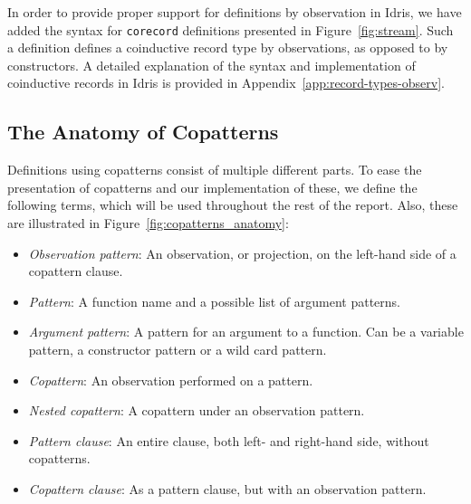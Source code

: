 

In order to provide proper support for definitions by observation in Idris, we
have added the syntax for \texttt{corecord} definitions presented in
Figure~\ref{fig:stream}. Such a definition defines a coinductive record type by observations, as opposed to
by constructors. A detailed explanation of the syntax and implementation of
coinductive records in Idris is provided in Appendix~\ref{app:record-types-observ}.





\subsection{The Anatomy of Copatterns}
Definitions using copatterns consist of multiple different parts. To ease the
presentation of copatterns and our implementation of these, we define the
following terms, which will be used throughout the rest of the report. Also,
these are illustrated in
Figure~\ref{fig:copatterns_anatomy}:

\newcommand{\itemEmph}[1]{\item \emph{#1}:}

\begin{itemize}
\itemEmph{Observation pattern} An observation, or projection, on the
  left-hand side of a copattern clause.
\itemEmph{Pattern} A function name and a possible list of argument patterns.
\itemEmph{Argument pattern} A pattern for an argument to a function. Can be a
variable pattern, a constructor pattern or a wild card pattern.
\itemEmph{Copattern} An observation performed on a pattern.
\itemEmph{Nested copattern} A copattern under an observation pattern.
\itemEmph{Pattern clause} An entire clause, both left- and right-hand side,
without copatterns.
\itemEmph{Copattern clause} As a pattern clause, but with an observation pattern.
\end{itemize}

